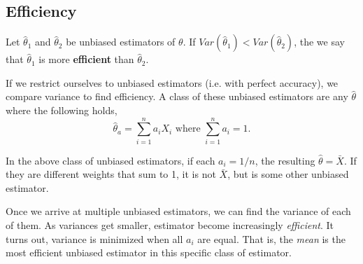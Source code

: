 \documentclass[titlepage, 12pt, leqno]{article}
\begin{document}
\subsection{Efficiency}
\begin{definition}
    Let $\hat \theta_{1}$ and $\hat \theta_{2}$ be unbiased estimators of
    $\theta$. If $Var(\hat \theta_{1}) < Var(\hat \theta_{2})$, the we say that
    $\hat \theta_{1}$ is more \textbf{efficient} than $\hat \theta_{2}$.
\end{definition}
If we restrict ourselves to unbiased estimators (i.e. with perfect accuracy), 
we compare variance to find efficiency. A class of these unbiased estimators are
any $\hat \theta$ where the following holds,
\[
    \hat \theta_{a} = \sum_{i=1}^{n}a_{i}X_{i} \text{  where  } \sum_{i=1}^{n}
    a_{i} = 1.
\]
\begin{note}
    In the above class of unbiased estimators, if each $a_{i} = 1/n$, the
    resulting $\hat \theta = \bar X$. If they are different weights that sum to
    1, it is not $\bar X$, but is some other unbiased estimator.
\end{note}
Once we arrive at multiple unbiased estimators, we can find the variance of
each of them. As variances get smaller, estimator become increasingly
\textit{efficient}. It turns out, variance is minimized when all $a_{i}$ are
equal. That is, the \textit{mean} is the most efficient unbiased estimator in 
this specific class of estimator.
\end{document}
